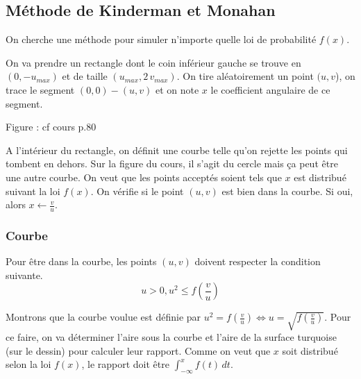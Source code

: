 
    


\subsection{Méthode de Kinderman et Monahan}
On cherche une méthode pour simuler n'importe quelle loi de probabilité $f(x)$.

On va prendre un rectangle dont le coin inférieur gauche se trouve en $(0, -u_{max})$ et de taille $(u_{max}, 2\,v_{max})$. On tire aléatoirement un point $(u, v$), on trace le segment $(0, 0) - (u, v)$ et on note $x$ le coefficient angulaire de ce segment.

Figure : cf cours p.80

A l'intérieur du rectangle, on définit une courbe telle qu'on rejette les points qui tombent en dehors. Sur la figure du cours, il s'agit du cercle mais ça peut être une autre courbe. On veut que les points acceptés soient tels que $x$ est distribué suivant la loi $f(x)$. On vérifie si le point $(u, v)$ est bien dans la courbe. Si oui, alors $x \gets \frac{v}{u}$.

\subsubsection{Courbe}
Pour être dans la courbe, les points $(u, v)$ doivent respecter la condition suivante.
\begin{equation}
    u > 0, u^2\leq f(\frac{v}{u})
    \label{eq:cercle}
\end{equation}

Montrons que la courbe voulue est définie par $u^2 = f(\frac{v}{u}) \iff u = \sqrt{f(\frac{v}{u})}$. Pour ce faire, on va déterminer l'aire sous la courbe et l'aire de la surface turquoise (sur le dessin) pour calculer leur rapport. Comme on veut que $x$ soit distribué selon la loi $f(x)$, le rapport doit être $\int_{-\infty}^x f(t)\,dt$.

